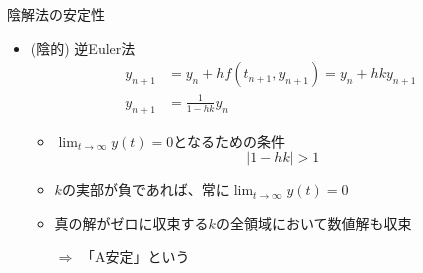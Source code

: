 \begin{frame}[t,fragile]{陰解法の安定性}
  \begin{itemize}
  \item (陰的) 逆Euler法
    \begin{align*}
    y_{n+1} &= y_n + h f(t_{n+1},y_{n+1}) = y_n + h k y_{n+1} \\
    y_{n+1} &= \frac{1}{1-hk} y_n
    \end{align*}
    \begin{itemize}
    \item $\displaystyle \lim_{t\rightarrow \infty} y(t) = 0$となるための条件
      \[
      |  1 - hk | > 1
      \]
    \item $k$の実部が負であれば、常に$\displaystyle \lim_{t\rightarrow \infty} y(t) = 0$
    \item 真の解がゼロに収束する$k$の全領域において数値解も収束

      $\Rightarrow$ 「A安定」という
    \end{itemize}
  \end{itemize}
\end{frame}
